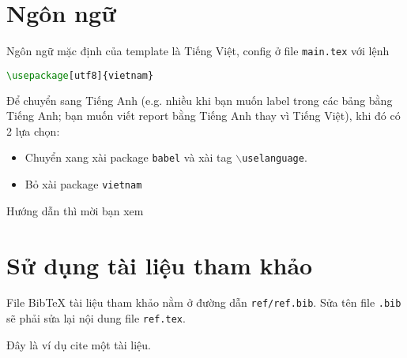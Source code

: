 \documentclass[a4paper,14pt]{article}
\begin{document}
\section{Ngôn ngữ}
Ngôn ngữ mặc định của template là Tiếng Việt, config ở file \texttt{main.tex} với lệnh
\begin{lstlisting}[language=tex]
	\usepackage[utf8]{vietnam}
\end{lstlisting}
Để chuyển sang Tiếng Anh (e.g. nhiều khi bạn muốn label trong các bảng bằng Tiếng Anh; bạn muốn viết report bằng Tiếng Anh thay vì Tiếng Việt), khi đó có 2 lựa chọn:
\begin{itemize}
	\item Chuyển xang xài package \texttt{babel} và xài tag \texttt{$\backslash$uselanguage}.
	\item Bỏ xài package \texttt{vietnam}
\end{itemize}
Hướng dẫn thì mời bạn xem 

\section{Sử dụng tài liệu tham khảo}

File BibTeX tài liệu tham khảo nằm ở đường dẫn \texttt{ref/ref.bib}. Sửa tên file \texttt{.bib} sẽ phải sửa lại nội dung file \texttt{ref.tex}.

Đây là ví dụ cite một tài liệu\cite{greenwade93}.


\cleardoublepage
{}
{}


\end{document}
